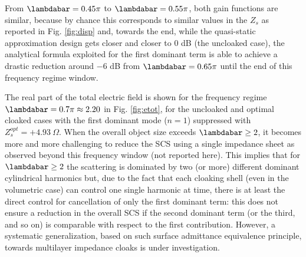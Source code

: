 \documentclass[reprint, showpacs, amsmath,amssymb, aps,
prb]{revtex4-1}
\begin{document}
%
From $\lambdabar=0.45\pi$ to $\lambdabar=0.55\pi$, both gain functions are similar, because by chance this corresponds to similar values in the $Z_s$ as reported in Fig. \ref{fig:disp} and, towards the end, while the quasi-static approximation design gets closer and closer to $0$ dB (the uncloaked case), the analytical formula exploited for the first dominant term is able to achieve a drastic reduction around $-6$ dB from $\lambdabar=0.65\pi$ until the end of this frequency regime window. 

The real part of the total electric field is shown for the frequency regime $\lambdabar=0.7\pi  \approx 2.20$ in Fig. \ref{fig:etot}, for the uncloaked and optimal cloaked cases with the first dominant mode ($n=1$) suppressed with $Z_s^{opt}=+4.93\ \Omega$.   
When the overall object size exceeds $\lambdabar \geq 2$, it becomes more and more challenging to reduce the SCS using a single impedance sheet as observed beyond this frequency window (not reported here). This implies that for $\lambdabar \geq 2$ the scattering is dominated by two (or more) different dominant cylindrical harmonics but, due to the fact that each cloaking shell (even in the volumetric case) can control one single harmonic at time, there is at least the direct control for cancellation of only the first dominant term: this does not ensure a reduction in the overall SCS if the second dominant term (or the third, and so on) is comparable with respect to the first contribution. However, a systematic generalization, based on such surface admittance equivalence principle, towards multilayer impedance cloaks is under investigation.  
\end{document}
